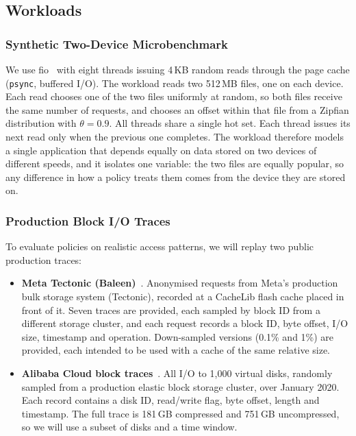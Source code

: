 \documentclass[11pt,sigconf,nonacm]{acmart}
\begin{document}
\subsection{Workloads}

\subsubsection{Synthetic Two-Device Microbenchmark}

We use fio~\cite{fio} with eight threads issuing 4\,KB random reads through the page cache (\texttt{psync}, buffered I/O). The workload reads two 512\,MB files, one on each device. Each read chooses one of the two files uniformly at random, so both files receive the same number of requests, and chooses an offset within that file from a Zipfian distribution with $\theta = 0.9$. All threads share a single hot set. Each thread issues its next read only when the previous one completes. The workload therefore models a single application that depends equally on data stored on two devices of different speeds, and it isolates one variable: the two files are equally popular, so any difference in how a policy treats them comes from the device they are stored on.

\subsubsection{Production Block I/O Traces}

To evaluate policies on realistic access patterns, we will replay two public production traces:

\begin{itemize}[leftmargin=1.5em, topsep=2pt, itemsep=1pt]
    \item \textbf{Meta Tectonic (Baleen)}~\cite{baleen}. Anonymised requests from Meta's production bulk storage system (Tectonic), recorded at a CacheLib flash cache placed in front of it. Seven traces are provided, each sampled by block ID from a different storage cluster, and each request records a block ID, byte offset, I/O size, timestamp and operation. Down-sampled versions (0.1\% and 1\%) are provided, each intended to be used with a cache of the same relative size.
    \item \textbf{Alibaba Cloud block traces}~\cite{alibabatraces}. All I/O to 1{,}000 virtual disks, randomly sampled from a production elastic block storage cluster, over January 2020. Each record contains a disk ID, read/write flag, byte offset, length and timestamp. The full trace is 181\,GB compressed and 751\,GB uncompressed, so we will use a subset of disks and a time window.
\end{itemize}
\end{document}
